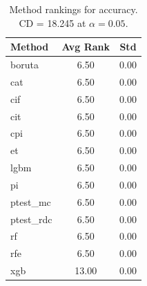 \begin{table}[h]
\centering
\caption{Method rankings for accuracy. CD = 18.245 at $\alpha=0.05$.}
\label{tab:ranks_accuracy}
\begin{tabular}{lcc}
\toprule
Method & Avg Rank & Std \\
\midrule
boruta & 6.50 & 0.00 \\
cat & 6.50 & 0.00 \\
cif & 6.50 & 0.00 \\
cit & 6.50 & 0.00 \\
cpi & 6.50 & 0.00 \\
et & 6.50 & 0.00 \\
lgbm & 6.50 & 0.00 \\
pi & 6.50 & 0.00 \\
ptest_mc & 6.50 & 0.00 \\
ptest_rdc & 6.50 & 0.00 \\
rf & 6.50 & 0.00 \\
rfe & 6.50 & 0.00 \\
xgb & 13.00 & 0.00 \\
\bottomrule
\end{tabular}
\end{table}